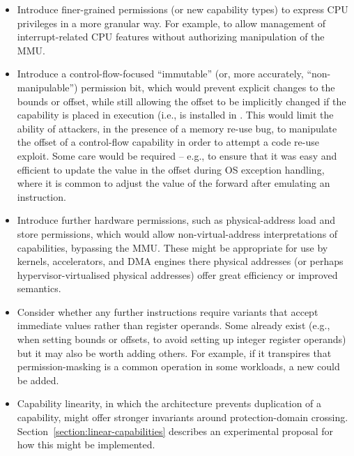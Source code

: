\begin{itemize}

\item Introduce finer-grained permissions (or new capability types) to express
  CPU privileges in a more granular way.
  For example, to allow management of interrupt-related CPU features without
  authorizing manipulation of the MMU.

\item Introduce a control-flow-focused ``immutable'' (or, more accurately,
  ``non-manipulable'') permission bit, which would prevent explicit changes to
  the bounds or offset, while still allowing the offset to be implicitly
  changed if the capability is placed in execution (i.e., is installed in
  \PCC{}.
  This would limit the ability of attackers, in the presence of a memory
  re-use bug, to manipulate the offset of a control-flow capability in order
  to attempt a code re-use exploit.
  Some care would be required -- e.g., to ensure that it was easy and
  efficient to update the value in the offset during OS exception handling,
  where it is common to adjust the value of the \PC{} forward after emulating
  an instruction.

\item Introduce further hardware permissions, such as physical-address load
  and store permissions, which would allow non-virtual-address interpretations
  of capabilities, bypassing the MMU.
  These might be appropriate for use by kernels, accelerators, and DMA engines
  there physical addresses (or perhaps hypervisor-virtualised physical
  addresses) offer great efficiency or improved semantics.

\item Consider whether any further instructions require variants that accept
  immediate values rather than register operands.
  Some already exist (e.g., when setting bounds or offsets, to avoid setting
  up integer register operands) but it may also be worth adding others.
  For example, if it transpires that permission-masking is a common operation
  in some workloads, a new  could be added.

\item Capability linearity, in which the architecture prevents duplication of
  a capability, might offer stronger invariants around protection-domain
  crossing.
  Section~\ref{section:linear-capabilities} describes an experimental proposal
  for how this might be implemented.


\end{itemize}
